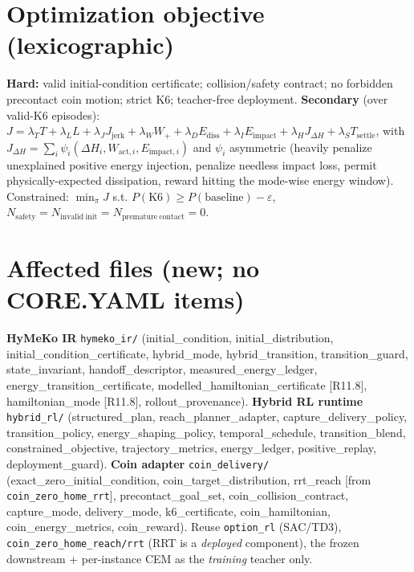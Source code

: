 \documentclass[11pt]{article}
\newcommand{\code}[1]{\texttt{\small #1}}
\begin{document}
\section{Optimization objective (lexicographic)}
\textbf{Hard:} valid initial-condition certificate; collision/safety contract; no forbidden precontact coin motion;
strict K6; teacher-free deployment. \textbf{Secondary} (over valid-K6 episodes):
$J=\lambda_T T+\lambda_L L+\lambda_J J_{\mathrm{jerk}}+\lambda_W W_+ +\lambda_D E_{\mathrm{diss}}+\lambda_I
E_{\mathrm{impact}}+\lambda_H J_{\Delta H}+\lambda_S T_{\mathrm{settle}}$, with $J_{\Delta H}=\sum_i\psi_i(\Delta
H_i,W_{\mathrm{act},i},E_{\mathrm{impact},i})$ and $\psi_i$ asymmetric (heavily penalize unexplained positive energy
injection, penalize needless impact loss, permit physically-expected dissipation, reward hitting the mode-wise energy
window). Constrained: $\min_\pi J$ s.t. $P(\mathrm{K6})\geq P(\mathrm{baseline})-\varepsilon$,
$N_{\mathrm{safety}}=N_{\mathrm{invalid\ init}}=N_{\mathrm{premature\ contact}}=0$.

\section{Affected files (new; no CORE.YAML items)}
\textbf{HyMeKo IR} \code{hymeko\_ir/} (initial\_condition, initial\_distribution, initial\_condition\_certificate,
hybrid\_mode, hybrid\_transition, transition\_guard, state\_invariant, handoff\_descriptor, measured\_energy\_ledger,
energy\_transition\_certificate, modelled\_hamiltonian\_certificate [R11.8], hamiltonian\_mode [R11.8],
rollout\_provenance). \textbf{Hybrid RL runtime} \code{hybrid\_rl/} (structured\_plan,
reach\_planner\_adapter, capture\_delivery\_policy, transition\_policy, energy\_shaping\_policy, temporal\_schedule,
transition\_blend, constrained\_objective, trajectory\_metrics, energy\_ledger, positive\_replay, deployment\_guard).
\textbf{Coin adapter} \code{coin\_delivery/} (exact\_zero\_initial\_condition, coin\_target\_distribution, rrt\_reach [from
\code{coin\_zero\_home\_rrt}], precontact\_goal\_set, coin\_collision\_contract, capture\_mode, delivery\_mode,
k6\_certificate, coin\_hamiltonian, coin\_energy\_metrics, coin\_reward). Reuse \code{option\_rl} (SAC/TD3),
\code{coin\_zero\_home\_reach/rrt} (RRT is a \emph{deployed} component), the frozen downstream + per-instance CEM as the
\emph{training} teacher only.
\end{document}
